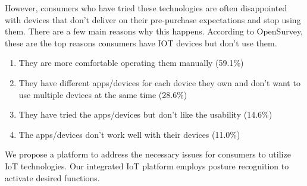 \documentclass[11pt, conference]{IEEEtran}
\begin{document}
However, consumers who have tried these technologies are often disappointed with devices that don't deliver on their pre-purchase expectations and stop using them. There are a few main reasons why this happens. According to OpenSurvey, these are the top reasons consumers have IOT devices but don't use them.\\
\begin{enumerate}
    \item They are more comfortable operating them manually (59.1\%)\\
    \item They have different apps/devices for each device they own and don't want to use multiple devices at the same time (28.6\%)\\
    \item They have tried the apps/devices but don't like the usability (14.6\%)\\
    \item The apps/devices don't work well with their devices (11.0\%)\\
\end{enumerate}

We propose a platform to address the necessary issues for consumers to utilize IoT technologies. Our integrated IoT platform employs posture recognition to activate desired functions.\\\\
\end{document}
